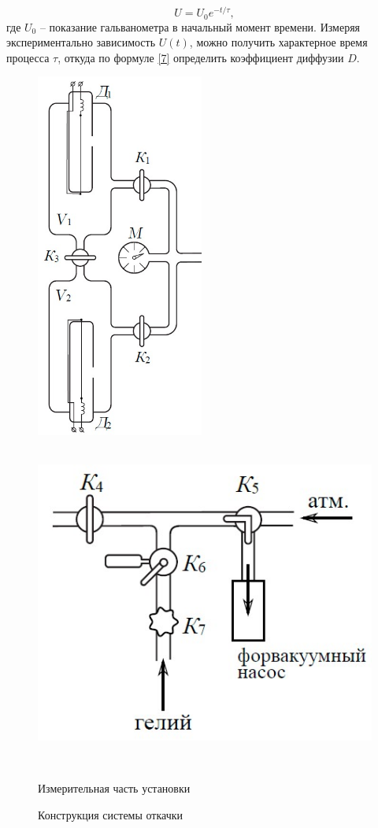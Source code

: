 \documentclass[a4paper, 12pt]{article}
\begin{document}
\begin{equation}\label{10}
U=U_0e^{-t/\tau},
\end{equation}
где $ U_0 $ -- показание гальванометра в начальный момент времени. Измеряя экспериментально зависимость $ U(t) $, можно получить характерное время
процесса $ \tau $, откуда по формуле \eqref{7} определить коэффициент диффузии $ D $.

\begin{figure}[htbp]
	\includegraphics[width=55mm]{ris2.jpg}
	\hfill
	\includegraphics[height=110mm]{ris3.jpg}\\
	\parbox{55mm}{\caption{Измерительная часть установки}\label{ris2}}
	\hfill
	\parbox{110mm}{\caption{Конструкция системы откачки}\label{ris3}}
\end{figure}
\end{document}
